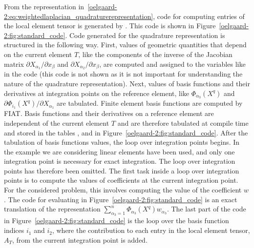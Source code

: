 From the representation
in~\eqref{oelgaard-2:eq:weightedlaplacian_quadraturerepresentation},
code for computing entries of the local element tensor is generated by
\ffc{}. This code is shown in
Figure~\ref{oelgaard-2:fig:standard_code}.  Code generated for the
quadrature representation is structured in the following way.  First,
values of geometric quantities that depend on the current element $T$,
like the components of the inverse of the Jacobian matrix $\partial
X_{\alpha_1} / \partial x_{\beta}$ and $\partial X_{\alpha_2}
/ \partial x_{\beta}$, are computed and assigned to the variables like
 in the code (this code is not shown as it is not important
for understanding the nature of the quadrature representation).  Next,
values of basis functions and their derivatives at integration points
on the reference element, like $\Phi_{\alpha_{3}}(X^q)$ and $\partial
\Phi_{i_1}(X^q) / \partial X_{\alpha_1}$ are tabulated.  Finite
element basis functions are computed by FIAT.  Basis functions and
their derivatives on a reference element are independent of the
current element $T$ and are therefore tabulated at compile time and
stored in the tables ,  and
 in Figure~\ref{oelgaard-2:fig:standard_code}.
After the tabulation of basis functions values, the loop over
integration points begins.  In the example we are considering linear
elements have been used, and only one integration point is necessary
for exact integration. The loop over integration points has therefore
been omitted.  The first task inside a loop over integration points is
to compute the values of coefficients at the current integration
point.  For the considered problem, this involves computing the value
of the coefficient $w$.  The code for evaluating  in
Figure~\ref{oelgaard-2:fig:standard_code} is an exact translation of
the representation $\sum_{\alpha_{3}=1}^n \Phi_{\alpha_{3}}(X^q)
w_{\alpha_{3}}$.  The last part of the code in
Figure~\ref{oelgaard-2:fig:standard_code} is the loop over the basis
function indices $i_{1}$ and $i_{2}$, where the contribution to each
entry in the local element tensor, $A_{T}$, from the current
integration point is added.

